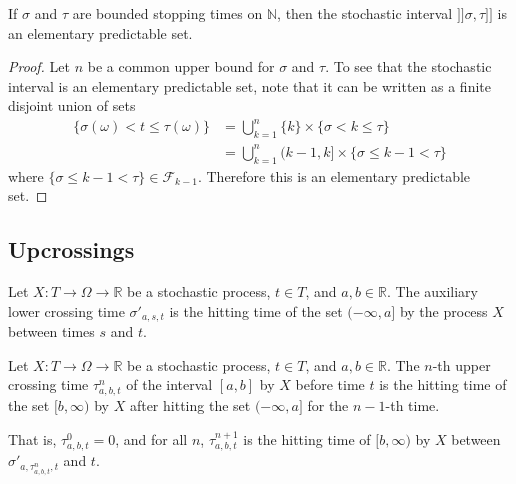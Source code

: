 \begin{lemma}\label{lem:elementaryPredictableSet_stochasticInterval}
If $\sigma$ and $\tau$ are bounded stopping times on $\mathbb{N}$, then the stochastic interval $]\!]\sigma, \tau]\!]$ is an elementary predictable set.
\end{lemma}

\begin{proof}
Let $n$ be a common upper bound for $\sigma$ and $\tau$.
To see that the stochastic interval is an elementary predictable set, note that it can be written as a finite disjoint union of sets
\begin{align*}
  \{\sigma(\omega) < t \le \tau(\omega)\}
  &= \bigcup_{k=1}^{n} \{k\} \times \{\sigma < k \le \tau\}
  \\ &= \bigcup_{k=1}^{n} (k-1, k] \times \{\sigma \le k-1 < \tau\}
\end{align*}
where $\{\sigma \le k-1 < \tau\} \in \mathcal{F}_{k-1}$.
Therefore this is an elementary predictable set.
\end{proof}


\subsection{Upcrossings}


\begin{definition}\label{def:lowerCrossingTimeAux}
  \mathlibok
Let $X : T \to \Omega \to \mathbb{R}$ be a stochastic process, $t \in T$, and $a, b \in \mathbb{R}$.
The auxiliary lower crossing time $\sigma'_{a, s, t}$ is the hitting time of the set $(-\infty, a]$ by the process $X$ between times $s$ and $t$.
\end{definition}


\begin{definition}\label{def:upperCrossingTime}
  \mathlibok
Let $X : T \to \Omega \to \mathbb{R}$ be a stochastic process, $t \in T$, and $a, b \in \mathbb{R}$.
The $n$-th upper crossing time $\tau^n_{a, b, t}$ of the interval $[a, b]$ by $X$ before time $t$ is the hitting time of the set $[b, \infty)$ by $X$ after hitting the set $(-\infty, a]$ for the $n-1$-th time.

That is, $\tau^0_{a, b, t} = 0$, and for all $n$, $\tau^{n+1}_{a, b, t}$ is the hitting time of $[b, \infty)$ by $X$ between $\sigma'_{a, \tau^{n}_{a, b, t}, t}$ and $t$.
\end{definition}


